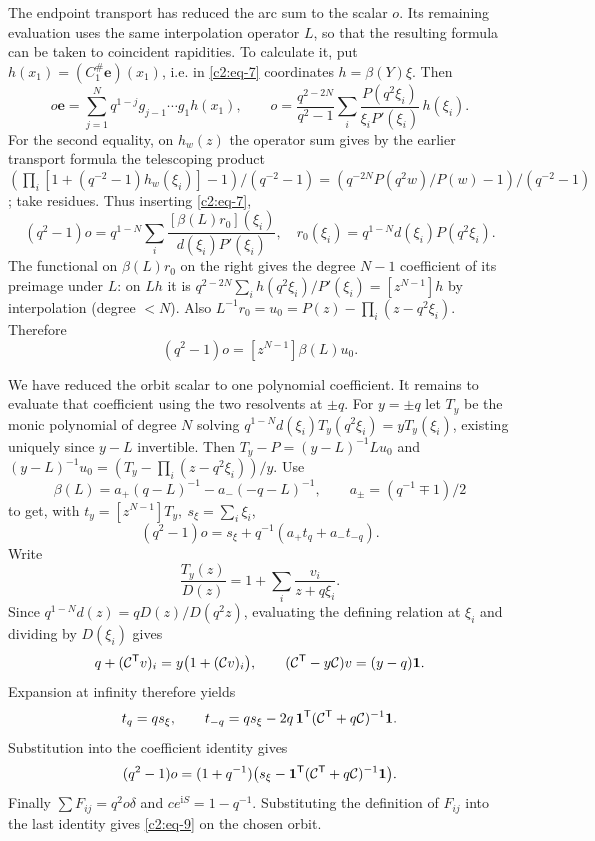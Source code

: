 The endpoint transport has reduced the arc sum to the scalar $o$. Its remaining evaluation uses the same interpolation operator $L$, so that the resulting formula can be taken to coincident rapidities. To calculate it, put \(h(x_1)=(C_1^\#\mathbf e)(x_1)\), i.e. in \eqref{c2:eq-7} coordinates \(h=\beta(Y)\xi\). Then
\[
 o\mathbf e=\sum_{j=1}^N q^{1-j}g_{j-1}\cdots g_1 h(x_1),\qquad
 o=\frac{q^{2-2N}}{q^2-1}\sum_i\frac{P(q^2\xi_i)}{\xi_i P'(\xi_i)}\,h(\xi_i).
\]
For the second equality, on \(h_w(z)\) the operator sum gives by the earlier transport formula the telescoping product
\((\prod_i[1+(q^{-2}-1)h_w(\xi_i)]-1)/(q^{-2}-1)=(q^{-2N}P(q^2w)/P(w)-1)/(q^{-2}-1)\); take residues. Thus inserting \eqref{c2:eq-7},
\[
 (q^2-1)o=q^{1-N}\sum_i\frac{[\beta(L)r_0](\xi_i)}{d(\xi_i)P'(\xi_i)},\quad
 r_0(\xi_i)=q^{1-N}d(\xi_i) P(q^2\xi_i).
\]
The functional on \(\beta(L)r_0\) on the right gives the degree \(N-1\) coefficient of its preimage under \(L\): on \(L h\) it is \(q^{2-2N}\sum_i h(q^2\xi_i)/P'(\xi_i)=[z^{N-1}]h\) by interpolation (degree \(<N\)). Also \(L^{-1}r_0=u_0=P(z)-\prod_i(z-q^2\xi_i)\). Therefore
\[
 (q^2-1)o=[z^{N-1}]\beta(L)u_0.
\]

We have reduced the orbit scalar to one polynomial coefficient.  It
remains to evaluate that coefficient using the two resolvents at $\pm q$.
For $y=\pm q$ let $T_y$ be the monic polynomial of degree \(N\) solving
\(q^{1-N}d(\xi_i)T_y(q^2\xi_i)=y T_y(\xi_i)\), existing uniquely since \(y-L\) invertible. Then \(T_y-P=(y-L)^{-1}L u_0\) and
\((y-L)^{-1}u_0=(T_y-\prod_i(z-q^2\xi_i))/y\). Use
\[
 \beta(L)=a_+(q-L)^{-1}-a_-(-q-L)^{-1},\qquad a_{\pm}=(q^{-1}\mp1)/2
\]
to get, with \(t_y=[z^{N-1}]T_y,\ s_\xi=\sum_i \xi_i\),
\[
 (q^2-1)o=s_\xi+q^{-1}(a_+ t_q+a_- t_{-q}).
\]
Write
\[
 \frac{T_y(z)}{D(z)}=1+\sum_i\frac{v_i}{z+q\xi_i}.
\]
Since $q^{1-N}d(z)=qD(z)/D(q^2z)$, evaluating the defining relation
at $\xi_i$ and dividing by $D(\xi_i)$ gives
\[
 q+(\mathcal C^{\mathsf T}v)_i
 =y\bigl(1+(\mathcal C v)_i\bigr),\qquad
 (\mathcal C^{\mathsf T}-y\mathcal C)v=(y-q){\bf1}.
\]
Expansion at infinity therefore yields
\[
 t_q=q s_\xi,\qquad
 t_{-q}=q s_\xi-2q\,{\bf1}^{\mathsf T}
                 (\mathcal C^{\mathsf T}+q\mathcal C)^{-1}{\bf1}.
\]
Substitution into the coefficient identity gives
\[
 (q^2-1)o=(1+q^{-1})\bigl(s_\xi-
 {\bf1}^{\mathsf T}(\mathcal C^{\mathsf T}+q\mathcal C)^{-1}{\bf1}\bigr).
\]
Finally $\sum F_{ij}=q^2o\delta$ and
$c e^{\mathrm iS}=1-q^{-1}$.  Substituting the definition of $F_{ij}$
into the last identity gives \eqref{c2:eq-9} on the chosen orbit.

